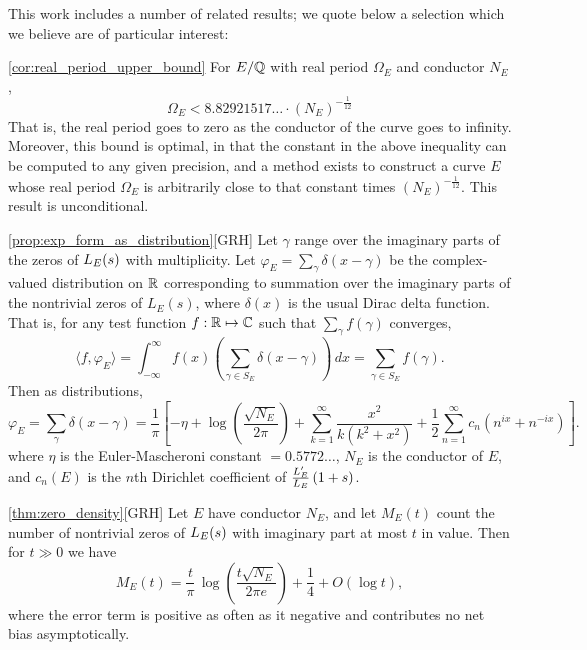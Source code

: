 This work includes a number of related results; we quote below a selection which we believe are of particular interest:

\begin{quotedcorollary}{\ref{cor:real_period_upper_bound}}
For $E/\mathbb{Q}$ with real period $\Omega_E$ and conductor $N_E$,
\begin{equation}
\Omega_E < 8.82921517\ldots \cdot (N_E)^{-\frac{1}{12}}
\end{equation}
That is, the real period goes to zero as the conductor of the curve goes to infinity. Moreover, this bound is optimal, in that the constant in the above inequality can be computed to any given precision, and a method exists to construct a curve $E$ whose real period $\Omega_E$ is arbitrarily close to  that constant times $(N_E)^{-\frac{1}{12}}$.  This result is unconditional.
\end{quotedcorollary}

\begin{quotedtheorem}{\ref{prop:exp_form_as_distribution}}[GRH]
Let $\gamma$ range over the imaginary parts of the zeros of $L_E(s)$ with multiplicity. Let $\varphi_E = \sum_{\gamma} \delta(x-\gamma)$ be the complex-valued distribution on $\mathbb{R}$ corresponding to summation over the imaginary parts of the nontrivial zeros of $L_E(s)$, where $\delta(x)$ is the usual Dirac delta function. That is, for any test function $f: \mathbb{R} \mapsto \mathbb{C}$ such that $\sum_{\gamma}f(\gamma)$ converges, 
\begin{equation}
\langle f,\varphi_E \rangle = \int_{-\infty}^{\infty} f(x)\left(\sum_{\gamma\in S_E} \delta(x-\gamma)\right) \, dx = \sum_{\gamma\in S_E} f(\gamma).
\end{equation}
Then as distributions,
\begin{equation}\label{eqn:exp_form_3}
\varphi_E = \sum_{\gamma} \delta(x-\gamma) = \frac{1}{\pi}\left[-\eta + \log\left(\frac{\sqrt{N_E}}{2\pi}\right) +\sum_{k=1}^{\infty} \frac{x^2}{k(k^2+x^2)} + \frac{1}{2}\sum_{n=1}^{\infty} c_n \left(n^{ix}+n^{-ix}\right) \right].
\end{equation}
where $\eta$ is the Euler-Mascheroni constant $= 0.5772\ldots$, $N_E$ is the conductor of $E$, and $c_n(E)$ is the $n$th Dirichlet coefficient of $\frac{L_E^{\prime}}{L_E}\left(1+s\right)$.
\end{quotedtheorem}

\begin{quotedtheorem}{\ref{thm:zero_density}}[GRH]
Let $E$ have conductor $N_E$, and let $M_E(t)$ count the number of nontrivial zeros of $L_E(s)$ with imaginary part at most $t$ in value. Then for $t \gg 0$ we have
\begin{equation}\label{eqn:zero_density}
M_E(t) = \frac{t}{\pi} \, \log\left(\frac{t\sqrt{N_E}}{2\pi e}\right) + \frac{1}{4} + O(\log t),
\end{equation}
where the error term is positive as often as it negative and contributes no net bias asymptotically.
\end{quotedtheorem}

